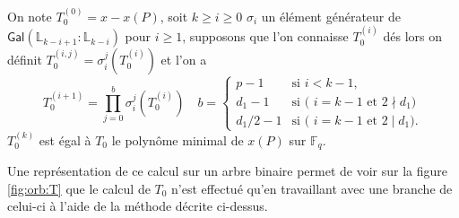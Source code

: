 \documentclass[10pt,a4paper]{book}
\theoremstyle{plain}
\theoremstyle{definition}
\theoremstyle{definition}
\theoremstyle{definition}
\theoremstyle{definition}
\theoremstyle{remark}
\theoremstyle{remark}
\theoremstyle{definition}
\begin{document}
On note $T_0^{(0)}=x-x(P)$, soit $k \geqslant i\geqslant 0$ $\sigma_i$ un élément générateur de $\mathsf{Gal}(\mathbb{L}_{k-i+1}:\mathbb{L}_{k-i})$ pour $i \geqslant 1$, supposons que l'on connaisse $T_0^{(i)}$ dés lors on définit $T_0^{(i,j)}=\sigma_i^j(T_0^{(i)})$ et l'on a 
\[
T_0^{(i+1)}=\prod_{j=0}^{b} \sigma_i^j(T_0^{(i)}) \quad  b = \begin{cases}
    p-1 &\text{si $i<k-1$,}\\
    d_1 -1  &\text{si ( $i=k-1$ et $2 \nmid d_1$)}\\
    d_1/2 - 1 &\text{si ( $i=k-1$ et $2 \mid d_1 $)}.
  \end{cases}
\]
 $T_0^{(k)}$ est égal à $T_0$ le polynôme minimal de $x(P)$ sur $\mathbb{F}_q$.

Une représentation de ce calcul sur un arbre binaire permet de voir sur la figure \ref{fig:orb:T} que le calcul de $T_0$  n'est effectué qu'en travaillant avec une branche de celui-ci à l'aide de la méthode décrite ci-dessus.
\end{document}
